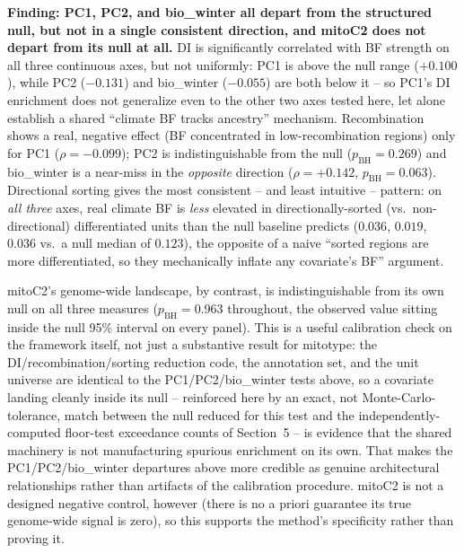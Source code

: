 \documentclass[11pt]{article}
\begin{document}
\textbf{Finding: PC1, PC2, and bio\_winter all depart from the structured null, but not in a
single consistent direction, and mitoC2 does not depart from its null at all.} DI is
significantly correlated with BF strength on all three continuous axes, but not uniformly:
PC1 is above the null range ($+0.100$), while PC2 ($-0.131$) and bio\_winter ($-0.055$) are
both below it -- so PC1's DI enrichment does not generalize even to the other two axes tested
here, let alone establish a shared ``climate BF tracks ancestry'' mechanism. Recombination
shows a real, negative effect (BF concentrated in low-recombination regions) only for PC1
($\rho=-0.099$); PC2 is indistinguishable from the null ($p_{\mathrm{BH}}=0.269$) and
bio\_winter is a near-miss in the \emph{opposite} direction ($\rho=+0.142$,
$p_{\mathrm{BH}}=0.063$). Directional sorting gives the most consistent -- and least
intuitive -- pattern: on \emph{all three} axes, real climate BF is \emph{less} elevated in
directionally-sorted (vs.\ non-directional) differentiated units than the null baseline
predicts ($0.036$, $0.019$, $0.036$ vs.\ a null median of $0.123$), the opposite of a naive
``sorted regions are more differentiated, so they mechanically inflate any covariate's BF''
argument.

mitoC2's genome-wide landscape, by contrast, is indistinguishable from its own null on all
three measures ($p_{\mathrm{BH}}=0.963$ throughout, the observed value sitting inside the
null 95\% interval on every panel). This is a useful calibration check on the framework
itself, not just a substantive result for mitotype: the DI/recombination/sorting reduction
code, the annotation set, and the unit universe are identical to the PC1/PC2/bio\_winter
tests above, so a covariate landing cleanly inside its null -- reinforced here by an exact,
not Monte-Carlo-tolerance, match between the null reduced for this test and the
independently-computed floor-test exceedance counts of Section~5 -- is evidence that the
shared machinery is not manufacturing spurious enrichment on its own. That makes the
PC1/PC2/bio\_winter departures above more credible as genuine architectural relationships
rather than artifacts of the calibration procedure. mitoC2 is not a designed negative
control, however (there is no a priori guarantee its true genome-wide signal is zero), so
this supports the method's specificity rather than proving it.
\end{document}

